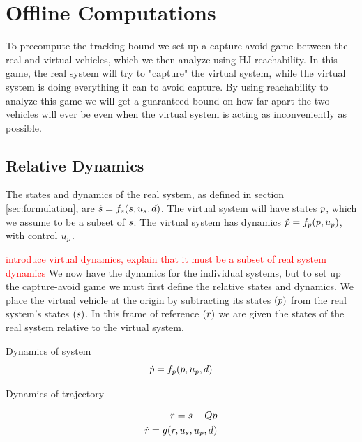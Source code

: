 \section{Offline Computations \label{sec:precomp}}

To precompute the tracking bound we set up a capture-avoid game between the real and virtual vehicles, which we then analyze using HJ reachability. In this game, the real system will try to "capture" the virtual system, while the virtual system is doing everything it can to avoid capture. By using reachability to analyze this game we will get a guaranteed bound on how far apart the two vehicles will ever be even when the virtual system is acting as inconveniently as possible. 

\subsection{Relative Dynamics}
The states and dynamics of the real system, as defined in section \ref{sec:formulation}, are $\dot{s} = f_s(s, u_s, d)$. The virtual system will have states $p$, which we assume to be a subset of $s$. The virtual system has dynamics $\dot{p} = f_p(p, u_p)$, with control $u_p$.

\textcolor{red}{introduce virtual dynamics, explain that it must be a subset of real system dynamics}
We now have the dynamics for the individual systems, but to set up the capture-avoid game we must first define the relative states and dynamics. We place the virtual vehicle at the origin by subtracting its states $(p)$ from the real system's states $(s)$. In this frame of reference $(r)$ we are given the states of the real system relative to the virtual system. 

Dynamics of system
\begin{equation}
\dot{p} = f_p(p, u_p, d)
\end{equation}

Dynamics of trajectory

\begin{equation}
\begin{aligned}
r = s - Qp\\
\dot{r} = g(r, u_s, u_p, d)
\end{aligned}
\end{equation}

